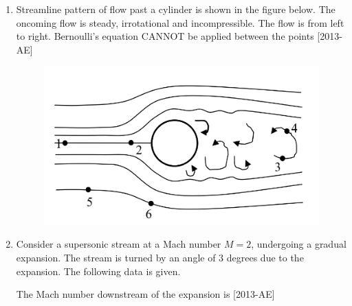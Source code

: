 \documentclass[journal]{IEEEtran}
\begin{document}
\begin{enumerate}[start=27]
\begin{enumerate}
\end{enumerate}
\item Streamline pattern of flow past a cylinder is shown in the figure below. The oncoming flow is steady, irrotational and incompressible. The flow is from left to right. Bernoulli's equation CANNOT be applied between the points \hfill{[2013-AE]}\\
\begin{figure}[h!]
    \centering
    \includegraphics[width=0.5\linewidth]{figs/Figure_2.png}
    \label{fig:enter-label}
\end{figure}
\begin{enumerate}
\end{enumerate}
\item Consider a supersonic stream at a Mach number $M=2$, undergoing a gradual expansion. The stream is turned by an angle of $3$ degrees due to the expansion. The following data is given.\\
\begin{table}[H]    
  \centering
  
  \label{tab1-1.8-10}
\end{table}
The Mach number downstream of the expansion is \hfill{[2013-AE]}
\begin{enumerate}
\end{enumerate}
\end{enumerate}
\end{document}
